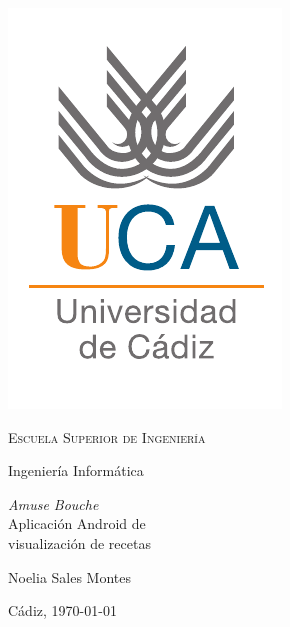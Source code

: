 \begin{titlepage}
  \centering
  \includegraphics[width=.3\textwidth]{previo/logo_uca}

  \bigskip
  \bigskip
  \bigskip

  \begin{changemargin}{2em}{2em}
    \centering

    {\Huge \textsc{\nohyphens{Escuela Superior de Ingeniería}}}

    \bigskip
    \bigskip
    \bigskip

    {\huge \nohyphens{Ingeniería Informática}}

    \bigskip
    \bigskip
    \bigskip
    \bigskip
    \bigskip
    \bigskip

    \begin{doublespace}
      {\LARGE \nohyphens{\textit{Amuse Bouche}\\
          Aplicación Android de\\visualización de recetas}}
    \end{doublespace}


    \bigskip
    \bigskip
    \bigskip
    \bigskip

    \bigskip
    \bigskip
    \bigskip
    \bigskip
    \bigskip
    \bigskip
    \bigskip

  \end{changemargin}

  {\Large Noelia Sales Montes \\}

  \bigskip

  {\large Cádiz, \today}

\end{titlepage}
